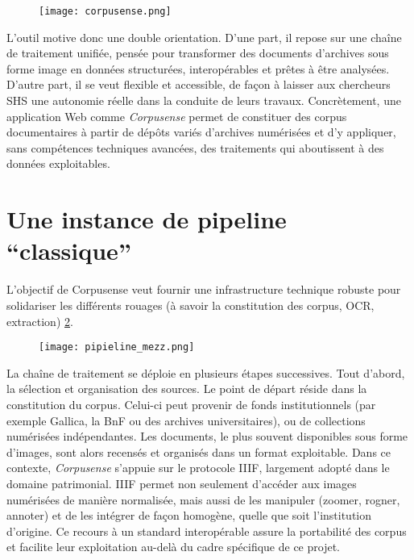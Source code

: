 \begin{figure}[htbp]
\centering
\texttt{[image: corpusense.png]}
\caption{}
\label{fig:corpusense}
\end{figure}

L'outil motive donc une double orientation. D’une part, il repose sur une chaîne de traitement unifiée, pensée pour transformer des documents d’archives sous forme image en données structurées, interopérables et prêtes à être analysées. D’autre part, il se veut flexible et accessible, de façon à laisser aux chercheurs SHS une autonomie réelle dans la conduite de leurs travaux. Concrètement, une application Web comme \emph{Corpusense} permet de constituer des corpus documentaires à partir de dépôts variés d’archives numérisées et d’y appliquer, sans compétences techniques avancées, des traitements qui aboutissent à des données exploitables.

\section{Une instance de pipeline \enquote{classique}}

L’objectif de Corpusense veut fournir une infrastructure technique robuste pour solidariser les différents rouages (à savoir la constitution des corpus, OCR, extraction) \ref{fig:pipieline_mezz}.

\begin{figure}[htbp]
\centering
\texttt{[image: pipieline\_mezz.png]}
\caption{}
\label{fig:pipieline_mezz}
\end{figure}

La chaîne de traitement se déploie en plusieurs étapes successives. Tout d'abord, la sélection et organisation des sources. Le point de départ réside dans la constitution du corpus. Celui-ci peut provenir de fonds institutionnels (par exemple Gallica, la BnF ou des archives universitaires), ou de collections numérisées indépendantes. Les documents, le plus souvent disponibles sous forme d’images, sont alors recensés et organisés dans un format exploitable. Dans ce contexte, \emph{Corpusense} s’appuie sur le protocole IIIF, largement adopté dans le domaine patrimonial. IIIF permet non seulement d’accéder aux images numérisées de manière normalisée, mais aussi de les manipuler (zoomer, rogner, annoter) et de les intégrer de façon homogène, quelle que soit l’institution d’origine. Ce recours à un standard interopérable assure la portabilité des corpus et facilite leur exploitation au-delà du cadre spécifique de ce projet. 

